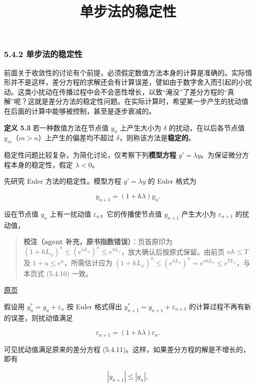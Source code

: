 \documentclass[
  10pt,
  fontset=fandol]{ctexart}
\title{单步法的稳定性}
\author{}
\date{}
\begin{document}
\maketitle

\subsubsection{5.4.2 单步法的稳定性}\label{ux5355ux6b65ux6cd5ux7684ux7a33ux5b9aux6027}

前面关于收敛性的讨论有个前提，必须假定数值方法本身的计算是准确的。实际情形并不是这样，差分方程的求解还会有计算误差，譬如由于数字舍入而引起的小扰动。这类小扰动在传播过程中会不会恶性增长，以致``淹没''了差分方程的``真解''呢？这就是差分方法的稳定性问题。在实际计算时，希望某一步产生的扰动值在后面的计算中能够被控制，甚至是逐步衰减的。

\textbf{定义 5.3} 若一种数值方法在节点值 \(y_n\) 上产生大小为 \(\delta\) 的扰动，在以后各节点值 \(y_m\)（\(m>n\)）上产生的偏差均不超过 \(\delta\)，则称该方法是\textbf{稳定的}。

稳定性问题比较复杂，为简化讨论，仅考察下列\textbf{模型方程} \(y'=\lambda y\)。为保证微分方程本身的稳定性，假定 \(\lambda<0\)。

先研究 Euler 方法的稳定性。模型方程 \(y'=\lambda y\) 的 Euler 格式为

\[
y_{n+1}=(1+h\lambda)y_n.\tag{5.4.11}
\]

设在节点值 \(y_n\) 上有一扰动值 \(\varepsilon_n\)，它的传播使节点值 \(y_{n+1}\) 产生大小为 \(\varepsilon_{n+1}\) 的扰动值，

\begin{quote}
\textbf{校注（agent 补充，原书指数错误）}：页首原印为 \((1+hL_\varphi)^n\leqslant(e^{nL_\varphi})^n\leqslant e^{hL_\varphi}\)，放大确认后按原式保留。由前页 \(nh\leqslant T\) 及 \(1+u\leqslant e^u\)，所需估计应为 \((1+hL_\varphi)^n\leqslant(e^{hL_\varphi})^n=e^{nhL_\varphi}\leqslant e^{TL_\varphi}\)，与本页式 (5.4.10) 一致。
\end{quote}

\href{../../source-images/pdf-136.jpeg}{原页}

假设用 \(y_n^*=y_n+\varepsilon_n\) 按 Euler 格式得出 \(y_{n+1}^*=y_{n+1}+\varepsilon_{n+1}\) 的计算过程不再有新的误差，则扰动值满足

\[
\varepsilon_{n+1}=(1+h\lambda)\varepsilon_n.
\]

可见扰动值满足原来的差分方程 (5.4.11)。这样，如果差分方程的解是不增长的，即有

\[
|y_{n+1}|\leqslant|y_n|,
\]
\end{document}
